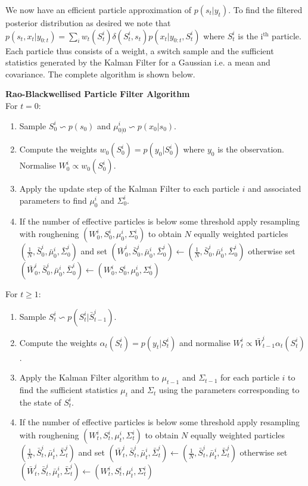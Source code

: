 We now have an efficient particle approximation of $p(s_t|y_t)$. To find the filtered posterior distribution as desired we note that $p(s_t,x_t|y_{0:t}) = \sum_i w_t(S_t^i)\delta(S_t^i, s_t)p(x_t|y_{0:t}, S_t^i)$ where $S_t^i$ is the i$^{\text{th}}$ particle. Each particle thus consists of a weight, a switch sample and the sufficient statistics generated by the Kalman Filter for a Gaussian i.e. a mean and covariance. The complete algorithm is shown below.

\textbf{Rao-Blackwellised Particle Filter Algorithm}\\
For $t=0$:
\begin{enumerate}
\item
Sample $S^i_0 \backsim p(s_0)$ and $\mu_{0|0}^i \backsim p(x_0|s_0)$.
\item
Compute the weights $w_0(S_0^i) = p(y_0|S_0^i)$ where $y_0$ is the observation. Normalise $W^i_0 \propto w_0(S^i_0)$.
\item
Apply the update step of the Kalman Filter to each particle $i$ and associated parameters to find $\mu_0^i$ and $\Sigma_0^i$. 
\item
If the number of effective particles is below some threshold apply resampling with roughening $(W^i_0, {S}^i_0,{\mu}^i_0, {\Sigma}^i_0)$ to obtain $N$ equally weighted particles $(\frac{1}{N}, \bar{S}^i_0, \bar{\mu}^i_0, \bar{\Sigma}^i_0)$ and set $(\bar{W}^i_0, \bar{S}^i_0, \bar{\mu}^i_0, \bar{\Sigma}^i_0) \leftarrow (\frac{1}{N}, \bar{S}^i_0, \bar{\mu}^i_0, \bar{\Sigma}^i_0)$ otherwise set $(\bar{W}^i_0, \bar{S}^i_0, \bar{\mu}^i_0, \bar{\Sigma}^i_0) \leftarrow ({W}^i_0, {S}^i_0, \mu^i_0, \Sigma_0^i)$
\end{enumerate}
For $t \geq 1$:
\begin{enumerate}
\item
Sample $S^i_t \backsim p(S_t^i|\bar{S}^i_{t-1})$.
\item
Compute the weights $\alpha_t(S^i_{t}) = p(y_t|S_t^i)$ and normalise $W^i_t \propto \bar{W}^i_{t-1}\alpha_t(S^i_{t})$.
\item
Apply the Kalman Filter algorithm to $\mu_{t-1}$ and $\Sigma_{t-1}$ for each particle $i$ to find the sufficient statistics $\mu_{t}$ and $\Sigma_{t}$ using the parameters corresponding to the state of $S^i_t$.
\item
If the number of effective particles is below some threshold apply resampling with roughening $(W^i_t, {S}^i_t,{\mu}^i_t, {\Sigma}^i_t)$ to obtain $N$ equally weighted particles $(\frac{1}{N}, \bar{S}^i_t, \bar{\mu}^i_t, \bar{\Sigma}^i_t)$ and set $(\bar{W}^i_t, \bar{S}^i_t, \bar{\mu}^i_t, \bar{\Sigma}^i_t) \leftarrow (\frac{1}{N}, \bar{S}^i_t, \bar{\mu}^i_t, \bar{\Sigma}^i_t)$ otherwise set $(\bar{W}^i_t, \bar{S}^i_t, \bar{\mu}^i_t, \bar{\Sigma}^i_t) \leftarrow ({W}^i_t, {S}^i_t, \mu^i_t, \Sigma_t^i)$
\end{enumerate} 

